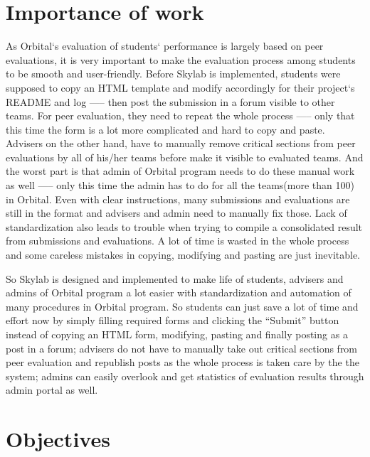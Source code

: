 \section{Importance of work}
As Orbital`s evaluation of students` performance is largely based on peer evaluations, it is very important to make the evaluation process among students to be smooth and user-friendly. Before Skylab is implemented, students were supposed to copy an HTML template and modify accordingly for their project`s README and log —-- then post the submission in a forum visible to other teams. For peer evaluation, they need to repeat the whole process —-- only that this time the form is a lot more complicated and hard to copy and paste. Advisers on the other hand, have to manually remove critical sections from peer evaluations by all of his/her teams before make it visible to evaluated teams. And the worst part is that admin of Orbital program needs to do these manual work as well  —-- only this time the admin has to do for all the teams(more than 100) in Orbital. Even with clear instructions, many submissions and evaluations are still in the format and advisers and admin need to manually fix those. Lack of standardization also leads to trouble when trying to compile a consolidated result from submissions and evaluations. A lot of time is wasted in the whole process and some careless mistakes in copying, modifying and pasting are just inevitable. 

So Skylab is designed and implemented to make life of students, advisers and admins of Orbital program a lot easier with standardization and automation of many procedures in Orbital program. So students can just save a lot of time and effort now by simply filling required forms and clicking the ``Submit'' button instead of copying an HTML form, modifying, pasting and finally posting as a post in a forum; advisers do not have to manually take out critical sections from peer evaluation and republish posts as the whole process is taken care by the the system; admins can easily overlook and get statistics of evaluation results through admin portal as well.

\section{Objectives}


